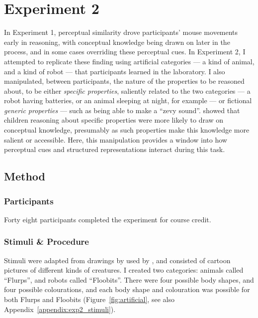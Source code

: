 
\section{Experiment 2}


In Experiment 1, perceptual similarity drove participants' mouse movements
early in reasoning,
with conceptual knowledge being drawn on later in the process,
and in some cases overriding these perceptual cues.
In Experiment 2, I attempted to replicate these finding
using artificial categories --- a kind of animal, and a kind of robot ---
that participants learned in the laboratory.
I also manipulated, between participants,
the nature of the properties to be reasoned about,
to be either \emph{specific properties}, saliently related to the two categories ---
a robot having batteries, or an animal sleeping at night, for example ---
or fictional \emph{generic properties} --- such as being able to make a ``zevy sound''.
\citet{Gelman2013c} showed that children reasoning about specific properties
were more likely to draw on conceptual knowledge,
presumably as such properties make this knowledge more salient or accessible.
Here, this manipulation provides a window into how
perceptual cues and structured representations interact during this task.

\subsection{Method}

\subsubsection{Participants}

Forty eight participants completed the experiment for course credit.

\subsubsection{Stimuli \& Procedure}

Stimuli were adapted from drawings by \citet{LaRiccia2005}
used by \citet{Sussman2014},
and consisted of cartoon pictures of different kinds of creatures.
I created two categories:
animals called ``Flurps'',
and robots called ``Floobits''.
There were four possible body shapes,
and four possible colourations,
and each body shape and colouration was possible for both Flurps and Floobits
(Figure~\ref{fig:artificial},
see also Appendix~\ref{appendix:exp2_stimuli}).

